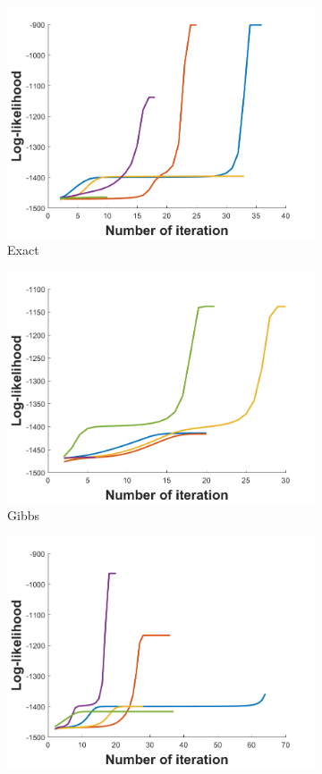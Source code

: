 \documentclass[10pt,a4paper]{report}
\begin{document}
\newpage

\begin{figure}[ht] 
  \begin{subfigure}[b]{0.5\linewidth}
    \centering
    \includegraphics[width=0.75\linewidth]{init_fhmm.png} 
    \caption{Exact} 
    \label{fig7:a} 
    \vspace{4ex}
  \end{subfigure}%
  \begin{subfigure}[b]{0.5\linewidth}
    \centering
    \includegraphics[width=0.75\linewidth]{init_gibbs.png} 
    \caption{Gibbs} 
    \label{fig7:b} 
    \vspace{4ex}
  \end{subfigure} 
  \begin{subfigure}[b]{0.5\linewidth}
    \centering
    \includegraphics[width=0.75\linewidth]{init_cfva.png} 

\end{subfigure}
\end{figure}
\end{document}
